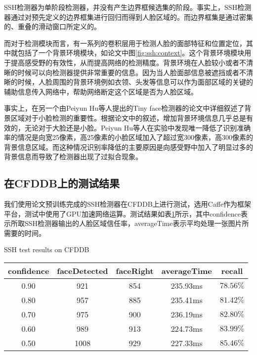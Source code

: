 SSH检测器为单阶段检测器，并没有产生边界框候选集的阶段。事实上，SSH检测器通过对预先定义的边界框集进行回归而得到人脸区域的。而边界框集是通过密集的、重叠的滑动窗口所定义的。

而对于检测模块而言，有一系列的卷积层用于检测人脸的面部特征和位置定位，其中就包括了一个背景环境模块，如论文\parencite{najibi2017ssh}中图\ref{fig:ssh:context}。这个背景环境模块用于提高感受野的有效性，从而提高网络的检测精度。背景环境在人脸较小或者不清晰的时候可以向检测器提供非常重要的信息。因为当人脸面部信息被遮挡或者不清晰的时候，人脸周围的背景环境例如衣领、头发等信息可以作为面部区域的关键的辅助信息传入网络中，帮助网络断定这个区域是否为人脸区域。

事实上，在另一个由Peiyun Hu等人提出的Tiny face检测器\cite{hu2017finding}的论文中详细叙述了背景区域对于小脸检测的重要性。根据论文中的叙述，增加背景环境信息几乎总是有效的，无论对于大脸还是小脸。Peiyun Hu等人在实验中发现唯一降低了识别准确率的情况是向宽25像素，高25像素的小脸区域加入了超过宽300像素，高300像素的背景信息区域。而这种情况识别率降低的主要原因是向感受野中加入了明显过多的背景信息而导致了检测器出现了过拟合现象。


\subsection{在CFDDB上的测试结果}
\label{chap2:sshresult}

我们使用论文\parencite{najibi2017ssh}预训练完成的SSH检测器在CFDDB上进行测试，选用Caffe作为框架平台，测试中使用了GPU加速网络运算。测试结果如表\ref{tab:ssh}所示，其中confidence表示所取SSH检测器输出的人脸区域信任率，averageTime表示平均处理一张图片所需要的时间。

\begin{table}[!hpb]
	\centering
	{SSH test results on CFDDB}
	\label{tab:ssh}
	\begin{tabular}{ cccc | c }
		\hline
		confidence & faceDetected & faceRight & averageTime & recall\\
		\hline
		0.90 & 921 & 854 & 235.93ms & $78.56\%$\\
		0.80 & 957 & 885 & 235.41ms & $81.42\%$\\
		0.70 & 975 & 900 & 236.19ms & $82.80\%$\\
		0.60 & 989 & 913 & 224.73ms & $83.99\%$\\
		0.50 & 1008 & 929 & 227.33ms & $85.46\%$\\
		\hline
	\end{tabular}
\end{table}

